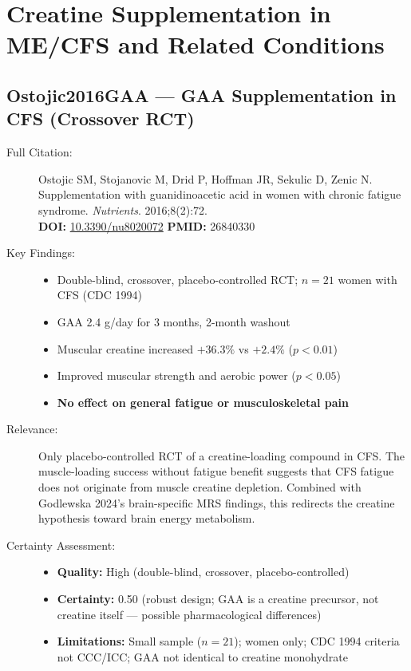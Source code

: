 
\section{Creatine Supplementation in ME/CFS and Related Conditions}

\subsection*{Ostojic2016GAA --- GAA Supplementation in CFS (Crossover RCT)}
\begin{description}
    \item[Full Citation:] Ostojic SM, Stojanovic M, Drid P, Hoffman JR, Sekulic D, Zenic N. Supplementation with guanidinoacetic acid in women with chronic fatigue syndrome. \textit{Nutrients}. 2016;8(2):72.\\
    \textbf{DOI:} \href{https://doi.org/10.3390/nu8020072}{10.3390/nu8020072} \quad \textbf{PMID:} 26840330
    \item[Key Findings:]
    \begin{itemize}
        \item Double-blind, crossover, placebo-controlled RCT; $n = 21$ women with CFS (CDC 1994)
        \item GAA 2.4 g/day for 3 months, 2-month washout
        \item Muscular creatine increased $+36.3\%$ vs $+2.4\%$ ($p < 0.01$)
        \item Improved muscular strength and aerobic power ($p < 0.05$)
        \item \textbf{No effect on general fatigue or musculoskeletal pain}
    \end{itemize}
    \item[Relevance:] Only placebo-controlled RCT of a creatine-loading compound in CFS. The muscle-loading success without fatigue benefit suggests that CFS fatigue does not originate from muscle creatine depletion. Combined with Godlewska 2024's brain-specific MRS findings, this redirects the creatine hypothesis toward brain energy metabolism.
    \item[Certainty Assessment:]
    \begin{itemize}
        \item \textbf{Quality:} High (double-blind, crossover, placebo-controlled)
        \item \textbf{Certainty:} 0.50 (robust design; GAA is a creatine precursor, not creatine itself --- possible pharmacological differences)
        \item \textbf{Limitations:} Small sample ($n = 21$); women only; CDC 1994 criteria not CCC/ICC; GAA not identical to creatine monohydrate
    \end{itemize}
\end{description}

